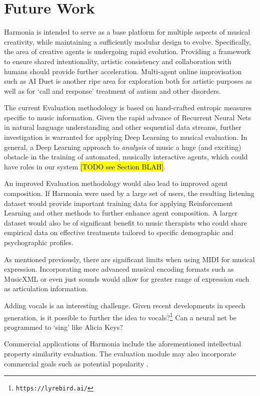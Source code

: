 \documentclass[final,authoryear,5p,times,twocolumn]{elsarticle}
\begin{document}
\section {Future Work}
\label{sec:future}

Harmonia is intended to serve as a base platform for multiple aspects of musical creativity, while maintaining a sufficiently modular design to evolve. Specifically, the area of creative agents is undergoing rapid evolution. Providing a framework to ensure shared intentionality, artistic consistency and collaboration with humans should provide further acceleration. Multi-agent online improvisation such as AI Duet is another ripe area for exploration both for artistic purposes as well as for `call and response' treatment of autism and other disorders. 

The current Evaluation methodology is based on hand-crafted entropic measures specific to music information. Given the rapid advance of Recurrent Neural Nets in natural language understanding and other sequential data streams, further investigation is warranted for applying Deep Learning to musical evaluation. In general, a Deep Learning approach to \textit{analysis} of music a huge (and exciting) obstacle in the training of automated, musically interactive agents, which could have roles in our system \hl{[TODO see Section BLAH]}.

An improved Evaluation methodology would also lead to improved agent composition. If Harmonia were used by a large set of users, the resulting listening dataset would provide important training data for applying Reinforcement Learning and other methods to further enhance agent composition. A larger dataset would also be of significant benefit to music therapists who could share empirical data on effective treatments tailored to specific demographic and psychographic profiles.

As mentioned previously, there are significant limits when using MIDI for musical expression. Incorporating more advanced musical encoding formats such as MusicXML or even just sounds would allow for greater range of expression such as articulation information.

Adding vocals is an interesting challenge. Given recent developments in speech generation, is it possible to further the idea to vocals?\footnote{\texttt{https://lyrebird.ai/}} Can a neural net be programmed to `sing' like Alicia Keys? 

Commercial applications of Harmonia include the aforementioned intellectual property similarity evaluation. The evaluation module may also incorporate commercial goals such as potential popularity \citep{phampredicting}.
\end{document}
